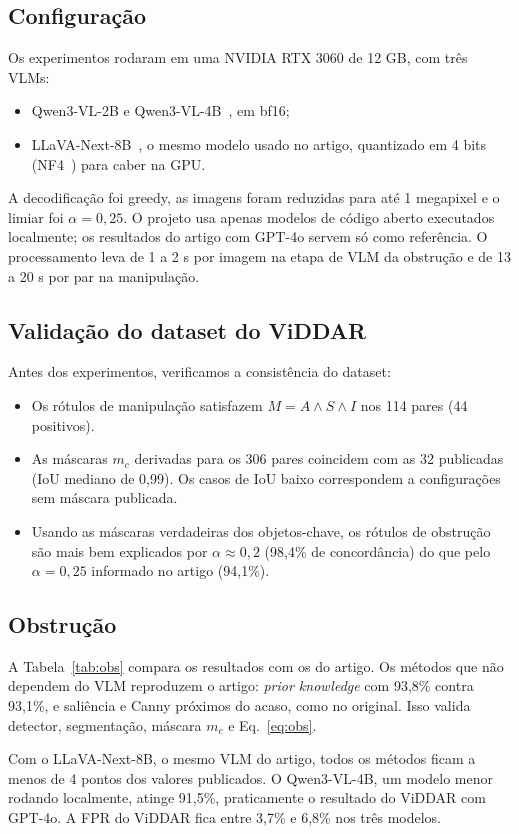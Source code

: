 \documentclass[journal,onecolumn]{IEEEtran}
\begin{document}
\subsection{Configuração}
Os experimentos rodaram em uma NVIDIA RTX 3060 de 12 GB, com três VLMs:
\begin{itemize}
\item Qwen3-VL-2B e Qwen3-VL-4B~\cite{qwen3vl}, em bf16;
\item LLaVA-Next-8B~\cite{llava}, o mesmo modelo usado no artigo, quantizado em 4 bits
  (NF4~\cite{qlora}) para caber na GPU.
\end{itemize}
A decodificação foi greedy, as imagens foram reduzidas para até 1 megapixel e o limiar foi
$\alpha=0{,}25$. O projeto usa apenas modelos de código aberto executados localmente; os resultados do
artigo com GPT-4o servem só como referência. O processamento leva de 1
a 2 s por imagem na etapa de VLM da obstrução e de 13 a 20 s por par na manipulação.

\subsection{Validação do dataset do ViDDAR}
Antes dos experimentos, verificamos a consistência do dataset:
\begin{itemize}
\item Os rótulos de manipulação satisfazem $M=A\wedge S\wedge I$ nos 114 pares (44 positivos).
\item As máscaras $m_c$ derivadas para os 306 pares coincidem com as 32 publicadas (IoU mediano de
  0,99). Os casos de IoU baixo correspondem a configurações sem máscara publicada.
\item Usando as máscaras verdadeiras dos objetos-chave, os rótulos de obstrução são mais bem
  explicados por $\alpha\approx 0{,}2$ (98,4\% de concordância) do que pelo $\alpha=0{,}25$ informado
  no artigo (94,1\%).
\end{itemize}

\subsection{Obstrução}
A Tabela~\ref{tab:obs} compara os resultados com os do artigo. Os métodos que não dependem do VLM
reproduzem o artigo: \emph{prior knowledge} com 93,8\% contra 93,1\%, e saliência e Canny próximos
do acaso, como no original. Isso valida detector, segmentação, máscara $m_c$ e Eq.~\eqref{eq:obs}.

Com o LLaVA-Next-8B, o mesmo VLM do artigo, todos os métodos ficam a menos de 4 pontos dos valores
publicados. O Qwen3-VL-4B, um modelo menor rodando localmente, atinge 91,5\%, praticamente o
resultado do ViDDAR com GPT-4o. A FPR do ViDDAR fica entre 3,7\% e 6,8\% nos três modelos.
\end{document}
